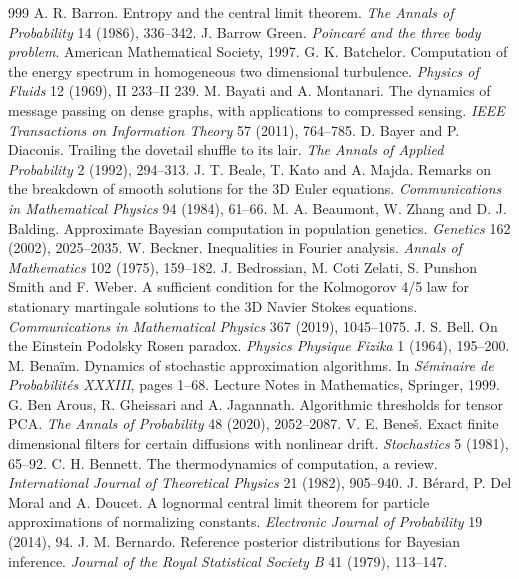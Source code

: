 \begin{thebibliography}{999}
 A. R. Barron. Entropy and the central limit theorem. \emph{The Annals of Probability} 14 (1986), 336--342.
 J. Barrow Green. \emph{Poincar\'e and the three body problem}. American Mathematical Society, 1997.
 G. K. Batchelor. Computation of the energy spectrum in homogeneous two dimensional turbulence. \emph{Physics of Fluids} 12 (1969), II 233--II 239.
 M. Bayati and A. Montanari. The dynamics of message passing on dense graphs, with applications to compressed sensing. \emph{IEEE Transactions on Information Theory} 57 (2011), 764--785.
 D. Bayer and P. Diaconis. Trailing the dovetail shuffle to its lair. \emph{The Annals of Applied Probability} 2 (1992), 294--313.
 J. T. Beale, T. Kato and A. Majda. Remarks on the breakdown of smooth solutions for the 3D Euler equations. \emph{Communications in Mathematical Physics} 94 (1984), 61--66.
 M. A. Beaumont, W. Zhang and D. J. Balding. Approximate Bayesian computation in population genetics. \emph{Genetics} 162 (2002), 2025--2035.
 W. Beckner. Inequalities in Fourier analysis. \emph{Annals of Mathematics} 102 (1975), 159--182.
 J. Bedrossian, M. Coti Zelati, S. Punshon Smith and F. Weber. A sufficient condition for the Kolmogorov 4/5 law for stationary martingale solutions to the 3D Navier Stokes equations. \emph{Communications in Mathematical Physics} 367 (2019), 1045--1075.
 J. S. Bell. On the Einstein Podolsky Rosen paradox. \emph{Physics Physique Fizika} 1 (1964), 195--200.
 M. Bena\"im. Dynamics of stochastic approximation algorithms. In \emph{S\'eminaire de Probabilit\'es XXXIII}, pages 1--68. Lecture Notes in Mathematics, Springer, 1999.
 G. Ben Arous, R. Gheissari and A. Jagannath. Algorithmic thresholds for tensor PCA. \emph{The Annals of Probability} 48 (2020), 2052--2087.
 V. E. Bene\v{s}. Exact finite dimensional filters for certain diffusions with nonlinear drift. \emph{Stochastics} 5 (1981), 65--92.
 C. H. Bennett. The thermodynamics of computation, a review. \emph{International Journal of Theoretical Physics} 21 (1982), 905--940.
 J. B\'erard, P. Del Moral and A. Doucet. A lognormal central limit theorem for particle approximations of normalizing constants. \emph{Electronic Journal of Probability} 19 (2014), 94.
 J. M. Bernardo. Reference posterior distributions for Bayesian inference. \emph{Journal of the Royal Statistical Society B} 41 (1979), 113--147.

\end{thebibliography}
